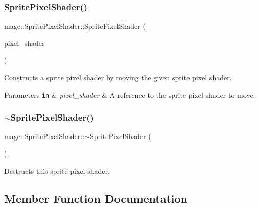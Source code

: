 \subsubsection{\texorpdfstring{Sprite\+Pixel\+Shader()}{SpritePixelShader()}\hspace{0.1cm}{\footnotesize\ttfamily [4/4]}}
{\footnotesize\ttfamily mage\+::\+Sprite\+Pixel\+Shader\+::\+Sprite\+Pixel\+Shader (\begin{DoxyParamCaption}\item[{\hyperlink{classmage_1_1_sprite_pixel_shader}{Sprite\+Pixel\+Shader} \&\&}]{pixel\+\_\+shader }\end{DoxyParamCaption})\hspace{0.3cm}{\ttfamily [default]}}

Constructs a sprite pixel shader by moving the given sprite pixel shader.


\begin{DoxyParams}[1]{Parameters}
\mbox{\tt in}  & {\em pixel\+\_\+shader} & A reference to the sprite pixel shader to move. \\
\hline
\end{DoxyParams}
\hypertarget{classmage_1_1_sprite_pixel_shader_a0e2a3f2b52417ebffc56db3739bdd0c2}{}\label{classmage_1_1_sprite_pixel_shader_a0e2a3f2b52417ebffc56db3739bdd0c2} 
\subsubsection{\texorpdfstring{$\sim$\+Sprite\+Pixel\+Shader()}{~SpritePixelShader()}}
{\footnotesize\ttfamily mage\+::\+Sprite\+Pixel\+Shader\+::$\sim$\+Sprite\+Pixel\+Shader (\begin{DoxyParamCaption}{ }\end{DoxyParamCaption})\hspace{0.3cm}{\ttfamily [virtual]}, {\ttfamily [default]}}

Destructs this sprite pixel shader. 

\subsection{Member Function Documentation}
\hypertarget{classmage_1_1_sprite_pixel_shader_adf6e6f0872406b9df46cb87731ed1ae0}{}\label{classmage_1_1_sprite_pixel_shader_adf6e6f0872406b9df46cb87731ed1ae0} 
